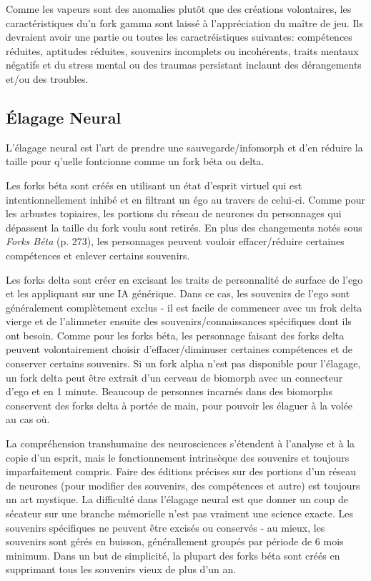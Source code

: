 Comme les vapeurs sont des anomalies plutôt que des créations volontaires, les caractéristiques du'n fork gamma sont laissé à l'appréciation du maître de jeu. Ils devraient avoir une partie ou toutes les caractréistiques suivantes: compétences réduites, aptitudes réduites, souvenirs incomplets ou incohérents, traits mentaux négatifs et du stress mental ou des traumas persistant inclaunt des dérangements et/ou des troubles. 

\subsection{Élagage Neural} 

L'élagage neural est l'art de prendre une sauvegarde/infomorph et d'en réduire la taille pour q'uelle fontcionne comme un fork béta ou delta. 

Les forks béta sont créés en utilisant un état d'esprit virtuel qui est intentionnellement inhibé et en filtrant un égo au travers de celui-ci. Comme pour les arbustes topiaires, les portions du réseau de neurones du personnages qui dépassent la taille du fork voulu sont retirés. En plus des changements notés sous \textit{Forks Béta} (p. 273), les personnages peuvent vouloir effacer/réduire certaines compétences et enlever certains souvenirs. 

Les forks delta sont créer en excisant les traits de personnalité de surface de l'ego et les appliquant sur une IA générique. Dans ce cas, les souvenirs de l'ego sont généralement complètement exclus - il est facile de commencer avec un frok delta vierge et de l'alimneter ensuite des souvenirs/connaissances spécifiques dont ils ont besoin. Comme pour les forks béta, les personnage faisant des forks delta peuvent volontairement choisir d'effacer/diminuser certaines compétences et de conserver certains souvenirs. Si un fork alpha n'est pas disponible pour l'élagage, un fork delta peut être extrait d'un cerveau de biomorph avec un connecteur d'ego et en 1 minute. Beaucoup de personnes incarnés dans des biomorphs conservent des forks delta à portée de main, pour pouvoir les élaguer à la volée au cas où. 

La compréhension transhumaine des neurosciences s'étendent à l'analyse et à la copie d'un esprit, mais le fonctionnement intrinsèque des souvenirs et toujours imparfaitement compris. Faire des éditions précises sur des portions d'un réseau de neurones (pour modifier des souvenirs, des compétences et autre) est toujours un art mystique. La difficulté dans l'élagage neural est que donner un coup de sécateur sur une branche mémorielle n'est pas vraiment une science exacte. Les souvenirs spécifiques ne peuvent être excisés ou conservés - au mieux, les souvenirs sont gérés en buisson, générallement groupés par période de 6 mois minimum. Dans un but de simplicité, la plupart des forks béta sont créés en supprimant tous les souvenirs vieux de plus d'un an. 

